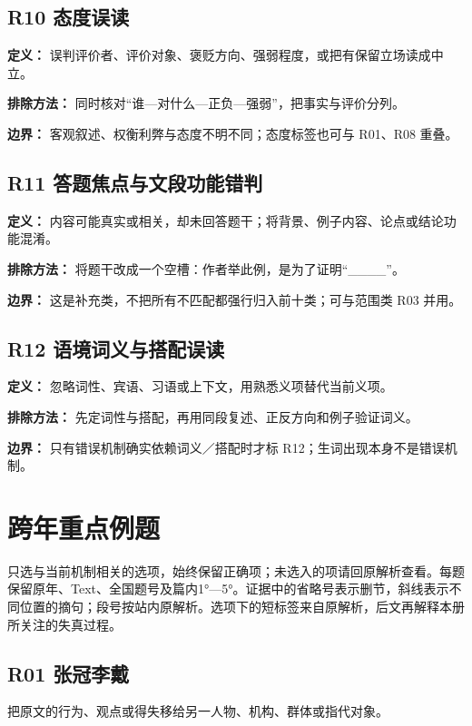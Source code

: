 \documentclass[11pt,a4paper]{article}
\begin{document}
\subsection{R10 态度误读}\label{cat-R10}
\noindent\textbf{定义：} 误判评价者、评价对象、褒贬方向、强弱程度，或把有保留立场读成中立。\par\smallskip
\noindent\textbf{排除方法：} 同时核对“谁—对什么—正负—强弱”，把事实与评价分列。\par\smallskip
\noindent\textbf{边界：} 客观叙述、权衡利弊与态度不明不同；态度标签也可与 R01、R08 重叠。\par\smallskip
{}
\subsection{R11 答题焦点与文段功能错判}\label{cat-R11}
\noindent\textbf{定义：} 内容可能真实或相关，却未回答题干；将背景、例子内容、论点或结论功能混淆。\par\smallskip
\noindent\textbf{排除方法：} 将题干改成一个空槽：作者举此例，是为了证明“\_\_\_\_”。\par\smallskip
\noindent\textbf{边界：} 这是补充类，不把所有不匹配都强行归入前十类；可与范围类 R03 并用。\par\smallskip
{}
\subsection{R12 语境词义与搭配误读}\label{cat-R12}
\noindent\textbf{定义：} 忽略词性、宾语、习语或上下文，用熟悉义项替代当前义项。\par\smallskip
\noindent\textbf{排除方法：} 先定词性与搭配，再用同段复述、正反方向和例子验证词义。\par\smallskip
\noindent\textbf{边界：} 只有错误机制确实依赖词义／搭配时才标 R12；生词出现本身不是错误机制。\par\smallskip
\clearpage\section{跨年重点例题}\label{cases}
只选与当前机制相关的选项，始终保留正确项；未选入的项请回原解析查看。每题保留原年、Text、全国题号及篇内1°—5°。证据中的省略号表示删节，斜线表示不同位置的摘句；段号按站内原解析。选项下的短标签来自原解析，后文再解释本册所关注的失真过程。

\subsection{R01 张冠李戴}
把原文的行为、观点或得失移给另一人物、机构、群体或指代对象。
\end{document}
